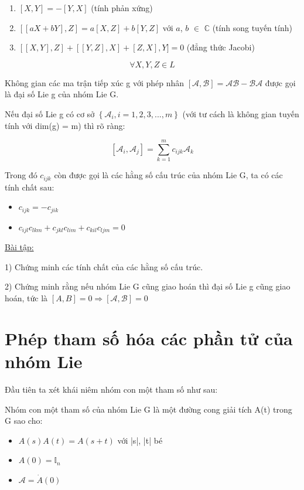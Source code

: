 \documentclass{report}
\begin{document}
	\begin{enumerate}
		\item \( [X,Y] = -[Y,X] \) (tính phản xứng)
		\item \( [[aX + bY],Z] = a[X,Z] + b[Y,Z] \) với \( a \), \( b \) \( \in \) \( \mathbb{C} \) (tính song tuyến tính)
		\item \( [[X,Y],Z] + [[Y,Z],X] + [Z,X],Y] = 0 \) (đẳng thức Jacobi)
	\end{enumerate}	 
 
\[ \forall X, Y, Z \in L \] 
 
Không gian các ma trận tiếp xúc g với phép nhân \( [\mathcal{A}, \mathcal{B}] = \mathcal{A} \mathcal{B} - \mathcal{B} \mathcal{A} \) được gọi là đại số Lie g của nhóm Lie G.

Nếu đại số Lie g có cơ sở \( \left\lbrace \mathcal{A}_{i}, i =1, 2, 3, ..., m \right\rbrace \) (với tư cách là không gian tuyến tính với dim(g) = m) thì rõ ràng:

\[ [\mathcal{A}_{i}, \mathcal{A}_{j}] = \sum_{k=1}^{m} c_{ijk}\mathcal{A}_{k} \]

Trong đó \( c_{ijk} \) còn được gọi là các hằng số cấu trúc của nhóm Lie G, ta có các tính chất sau:

	\begin{itemize}
		\item \( c_{ijk} = -c_{jik} \)
		\item \( c_{ijl}c_{lkm} + c_{jkl}c_{lim} + c_{kil}c_{ljm} = 0 \)
	\end{itemize}
 
\underline{Bài tập:}

1) Chứng minh các tính chất của các hằng số cấu trúc.

2) Chứng minh rằng nếu nhóm Lie G cũng giao hoán thì đại số Lie g cũng giao hoán, tức là \( [A,B] = 0 \Rightarrow [\mathcal{A}, \mathcal{B}] = 0 \)
  
\section{Phép tham số hóa các phần tử của nhóm Lie}  
Đầu tiên ta xét khái niêm nhóm con một tham số như sau:

Nhóm con một tham số của nhóm Lie G là một đường cong giải tích A(t) trong G sao cho:

	\begin{itemize}
	 \item \( A(s)A(t) = A(s+t) \) với |s|, |t| bé
	 \item \( A(0) = \mathbb{I}_{n} \)
	 \item \( \mathcal{A} = \dot{A}(0) \)
	\end{itemize}
	
\end{document}
